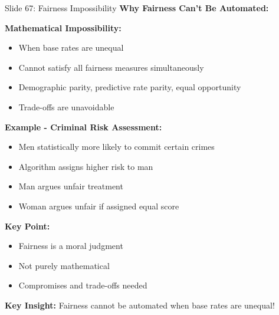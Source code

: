 \documentclass[8pt]{beamer}
\begin{document}
	\begin{frame}{Slide 67: Fairness Impossibility}
		\fontsize{6.5}{7.5}\selectfont
		\textbf{Why Fairness Can't Be Automated:}
		
		\vspace{0.1cm}
		\textbf{Mathematical Impossibility:}
		\begin{itemize}
			\item When base rates are unequal
			\item Cannot satisfy all fairness measures simultaneously
			\item Demographic parity, predictive rate parity, equal opportunity
			\item Trade-offs are unavoidable
		\end{itemize}
		
		\vspace{0.1cm}
		\textbf{Example - Criminal Risk Assessment:}
		\begin{itemize}
			\item Men statistically more likely to commit certain crimes
			\item Algorithm assigns higher risk to man
			\item Man argues unfair treatment
			\item Woman argues unfair if assigned equal score
		\end{itemize}
		
		\vspace{0.1cm}
		\textbf{Key Point:}
		\begin{itemize}
			\item Fairness is a moral judgment
			\item Not purely mathematical
			\item Compromises and trade-offs needed
		\end{itemize}
		
		\textcolor{myblue}{\textbf{Key Insight:}} Fairness cannot be automated when \textcolor{myblue}{base rates are unequal}!
	\end{frame}
	
\end{document}
